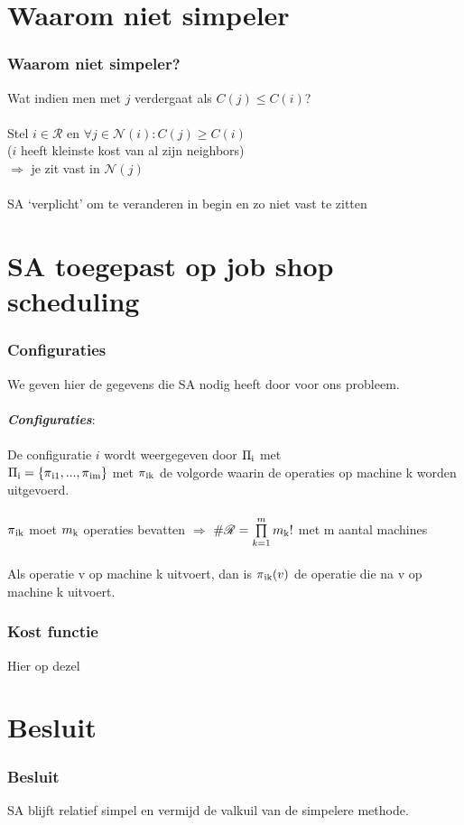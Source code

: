 \documentclass
   [kulak] %
   {kulakbeamer}
\begin{document}
\section[simpeler?]{Waarom niet simpeler}

\begin{frame}
	\frametitle{Waarom niet simpeler?}
	Wat indien men met $j$ verdergaat als $C(j) \leq C(i)$?\\~\\
	\pause
	Stel $i \in \mathscr{R}$ en $\forall j \in \mathscr{N}(i): C(j) \geqslant C(i)$ \\($i$ heeft kleinste kost van al zijn neighbors) \\
	$\Rightarrow$ je zit vast in $\mathscr{N}(j)$ \\~\\
	\pause
	SA `verplicht' om te veranderen in begin en zo niet vast te zitten
\end{frame}

\section[SA job shop]{SA toegepast op job shop scheduling}

\begin{frame}
	\frametitle{Configuraties}
	We geven hier de gegevens die SA nodig heeft door voor ons probleem.\pause 
	~\\~\\  \textbf{\textit{Configuraties}}: \\ ~\\
	De configuratie $i$ wordt weergegeven door $\Pi\textsubscript{i}$ met \\ $\Pi\textsubscript{i} = \{\pi\textsubscript{i1}, ... ,\pi\textsubscript{im}\}$
	met $\pi\textsubscript{ik}$ de volgorde waarin de operaties op machine k worden uitgevoerd. \pause	~\\~\\ $\pi\textsubscript{ik}$ moet $m\textsubscript{k}$ operaties bevatten $\Rightarrow$ $\#\mathscr{R} = \prod\limits_{k=1}^m m\textsubscript{k}!$ met m aantal machines \\~\\ Als operatie v op machine k uitvoert, dan is $\pi\textsubscript{ik}(v)$ de operatie die na v op machine k uitvoert.

\end{frame}

\begin{frame}
	\frametitle{Kost functie}
	Hier op dezel
\end{frame}


\section{Besluit}
\begin{frame}
\frametitle{Besluit}
SA blijft relatief simpel en vermijd de valkuil van de simpelere methode.
\end{frame}
\end{document}
